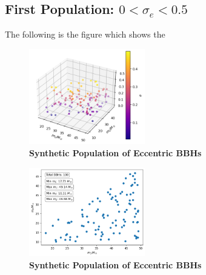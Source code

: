 \documentclass[twocolumn,prd,nofootinbib]{revtex4}
\begin{document}
\subsection{First Population: $0<\sigma_e<0.5$}
The following is the figure which shows the 

\begin{figure}
\includegraphics[width=0.45\textwidth]{paper/figures/pop3d05.png}
\caption{\label{fig:population05}\textbf{Synthetic Population of Eccentric BBHs}}
\end{figure}

\begin{figure}
\includegraphics[width=0.45\textwidth]{paper/figures/pop2d05.png}
\caption{\label{fig:population05}\textbf{Synthetic Population of Eccentric BBHs}}
\end{figure}
\end{document}

